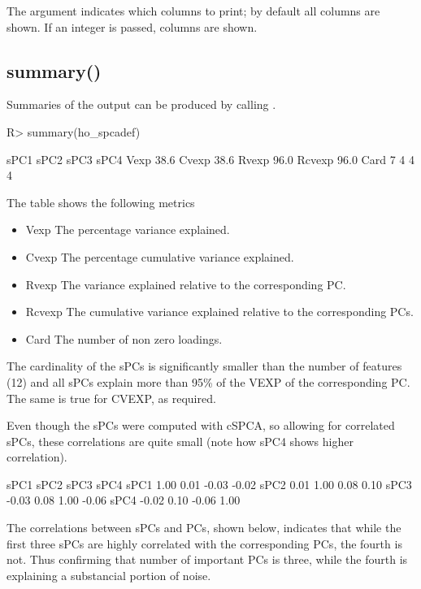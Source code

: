\documentclass[article]{jss}
\begin{document}
The argument  indicates which columns to print; by default all columns are shown. If an integer is passed, columns  are shown.  
\subsection{summary()}
Summaries of the  output can be produced by calling .
\begin{Schunk}
\begin{Sinput}
R> summary(ho_spcadef)
\end{Sinput}
\begin{Soutput}
        sPC1  sPC2  sPC3  sPC4
Vexp   38.6%
Cvexp  38.6%
Rvexp  96.0%
Rcvexp 96.0%
Card       7     4     4     4
\end{Soutput}
\end{Schunk}

The table shows the following metrics
\begin{itemize}
\item Vexp The percentage variance explained.
\item Cvexp The percentage cumulative variance explained.
\item Rvexp The variance explained relative to the corresponding PC.
\item Rcvexp The cumulative variance explained relative to the 
corresponding PCs.
\item Card  The number of non zero loadings.
\end{itemize}
The cardinality of the sPCs is significantly smaller than the number of features (12) and all sPCs explain more than 95\% of the VEXP of the corresponding PC. The same is true for CVEXP, as required.

Even though the sPCs were computed with cSPCA, so allowing for correlated sPCs, these correlations are quite small (note how sPC4 shows higher correlation).
\begin{Schunk}
\begin{Soutput}
      sPC1 sPC2  sPC3  sPC4
sPC1  1.00 0.01 -0.03 -0.02
sPC2  0.01 1.00  0.08  0.10
sPC3 -0.03 0.08  1.00 -0.06
sPC4 -0.02 0.10 -0.06  1.00
\end{Soutput}
\end{Schunk}

The correlations between sPCs and PCs, shown below, indicates that while the first three sPCs are highly correlated with the corresponding PCs, the fourth is not. Thus confirming that number of important PCs is three, while the fourth is explaining a substancial portion of noise.
\end{document}
